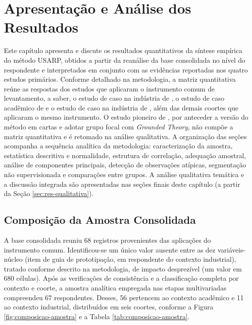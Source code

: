 \chapter{Apresentação e Análise dos Resultados}
\label{cap:resultados}

Este capítulo apresenta e discute os resultados quantitativos da síntese empírica do método USARP, obtidos a partir da reanálise da base consolidada no nível do respondente e interpretados em conjunto com as evidências reportadas nos quatro estudos primários. Conforme detalhado na metodologia, a matriz quantitativa reúne as respostas dos estudos que aplicaram o instrumento comum de levantamento, a saber, o estudo de caso na indústria de , o estudo de caso acadêmico de  e o estudo de caso na indústria de , além das demais coortes que aplicaram o mesmo instrumento. O estudo pioneiro de , por anteceder a versão do método em cartas e adotar grupo focal com \textit{Grounded Theory}, não compõe a matriz quantitativa e é retomado na análise qualitativa. A organização das seções acompanha a sequência analítica da metodologia: caracterização da amostra, estatística descritiva e normalidade, estrutura de correlação, adequação amostral, análise de componentes principais, detecção de observações atípicas, segmentação não supervisionada e comparações entre grupos. A análise qualitativa temática e a discussão integrada são apresentadas nas seções finais deste capítulo (a partir da Seção \ref{sec:res-qualitativa}).

\section{Composição da Amostra Consolidada}
\label{sec:res-amostra}

A base consolidada reuniu 68 registros provenientes das aplicações do instrumento comum. Identificou-se um único valor ausente entre as dez variáveis-núcleo (item de guia de prototipação, em respondente do contexto industrial), tratado conforme descrito na metodologia, de impacto desprezível (um valor em 680 células). Após as verificações de consistência e a classificação completa por contexto e coorte, a amostra analítica empregada nas etapas multivariadas compreendeu 67 respondentes. Desses, 56 pertencem ao contexto acadêmico e 11 ao contexto industrial, distribuídos em seis coortes, conforme a Figura \ref{fig:composicao-amostra} e a Tabela \ref{tab:composicao-amostra}.


